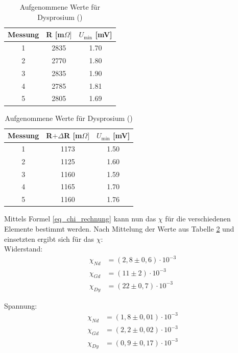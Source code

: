 \begin{table}[htbp]
\begin{tabular}{|c|c|c|}
Messung	& R [m$\Omega]$	&$U_\text{min}$ [mV]\\ \hline
1&	2835&	1.70\\ \hline
2&	2770&	1.80\\ \hline
3&	2835&	1.90\\ \hline
4&	2785&	1.81\\ \hline
5&	2805&	1.69\\ \hline

\end{tabular}
\begin{tabular}{|c|c|c|}
Messung	& R$+\Delta$R [m$\Omega]$ & $U_\text{min}$ [mV] \\ \hline
1&	1173&	1.50\\ \hline
2&	1125&	1.60\\ \hline
3&	1160&	1.59\\ \hline
4&	1165&	1.70\\ \hline
5&	1160&	1.76\\ \hline

\end{tabular}
\caption{Aufgenommene Werte für Dysprosium ()}
\label{t_werte}
\end{table}


Mittels Formel \eqref{eq_chi_rechnung} kann nun das $\chi$ für die verschiedenen Elemente bestimmt werden. Nach Mittelung der Werte aus Tabelle \ref{t_werte} und einsetzten ergibt sich für das $\chi$:\\

Widerstand:
\begin{align*}
\chi_{Nd}&=(2,8\pm 0,6)\cdot10^{-3}\\
\chi_{Gd}&=(11\pm 2)\cdot10^{-3}\\
\chi_{Dy}&=(22\pm 0,7)\cdot10^{-3}
\end{align*}

Spannung:
\begin{align*}
\chi_{Nd}&=(1,8\pm 0,01)\cdot10^{-3}\\
\chi_{Gd}&=(2,2\pm 0,02)\cdot10^{-3}\\
\chi_{Dy}&=(0,9\pm 0,17)\cdot10^{-3}
\end{align*}

